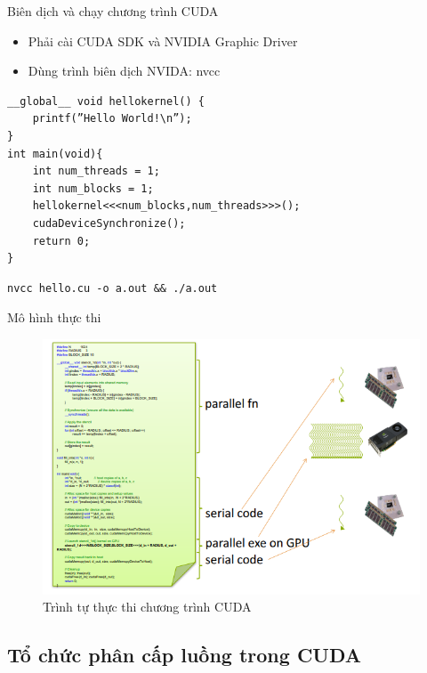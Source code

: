 \documentclass[10pt]{beamer}
\theoremstyle{remark}
\numberwithin{algocf}{section}
\numberwithin{equation}{section}
\numberwithin{dl}{section}
\numberwithin{figure}{section}
\begin{document}
\begin{frame}[fragile]{Biên dịch và chạy chương trình CUDA}
    \begin{itemize}
        \item Phải cài CUDA SDK và NVIDIA Graphic Driver
        \item Dùng trình biên dịch NVIDA: nvcc
    \end{itemize}
    \begin{verbatim}
__global__ void hellokernel() {
    printf(”Hello World!\n”);
}
int main(void){
    int num_threads = 1;
    int num_blocks = 1;
    hellokernel<<<num_blocks,num_threads>>>();
    cudaDeviceSynchronize();
    return 0;
}
    \end{verbatim}
    \begin{verbatim}
nvcc hello.cu -o a.out && ./a.out
    \end{verbatim}
\end{frame}

\begin{frame}{Mô hình thực thi}
    \begin{figure}[H]
        \centering
        \includegraphics[width=0.8\linewidth]{figures/CUDA/Execution_Model.png}
        \caption{Trình tự thực thi chương trình CUDA}
    \end{figure}
\end{frame}

\subsection{Tổ chức phân cấp luồng trong CUDA}
\end{document}
